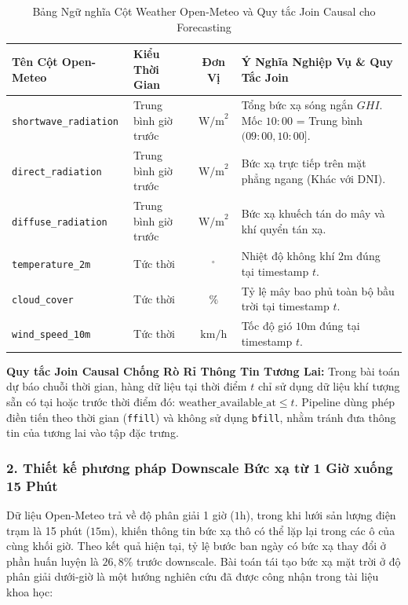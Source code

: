 \documentclass[12pt,a4paper]{article}
\begin{document}
\begin{table}[htbp]
\centering
\caption{Bảng Ngữ nghĩa Cột Weather Open-Meteo và Quy tắc Join Causal cho Forecasting}
\label{tab:openmeteo_semantics}
\begin{tabularx}{\linewidth}{l l c X}
\toprule
\textbf{Tên Cột Open-Meteo} & \textbf{Kiểu Thời Gian} & \textbf{Đơn Vị} & \textbf{Ý Nghĩa Nghiệp Vụ \& Quy Tắc Join} \\
\midrule
\texttt{shortwave\_radiation} & Trung bình giờ trước & $\text{W/m}^2$ & Tổng bức xạ sóng ngắn $GHI$. Mốc $10:00$ = Trung bình $(09:00, 10:00]$. \\
\texttt{direct\_radiation} & Trung bình giờ trước & $\text{W/m}^2$ & Bức xạ trực tiếp trên mặt phẳng ngang (Khác với DNI). \\
\texttt{diffuse\_radiation} & Trung bình giờ trước & $\text{W/m}^2$ & Bức xạ khuếch tán do mây và khí quyển tán xạ. \\
\texttt{temperature\_2m} & Tức thời & $^\circ\text{}$ & Nhiệt độ không khí $2\text{m}$ đúng tại timestamp $t$. \\
\texttt{cloud\_cover} & Tức thời & $\%$ & Tỷ lệ mây bao phủ toàn bộ bầu trời tại timestamp $t$. \\
\texttt{wind\_speed\_10m} & Tức thời & $\text{km/h}$ & Tốc độ gió $10\text{m}$ đúng tại timestamp $t$. \\
\bottomrule
\end{tabularx}
\end{table}

\textbf{Quy tắc Join Causal Chống Rò Rỉ Thông Tin Tương Lai:}  
Trong bài toán dự báo chuỗi thời gian, hàng dữ liệu tại thời điểm $t$ chỉ sử dụng dữ liệu khí tượng sẵn có tại hoặc trước thời điểm đó: $\text{weather\_available\_at} \le t$. Pipeline dùng phép điền tiến theo thời gian (\texttt{ffill}) và không sử dụng \texttt{bfill}, nhằm tránh đưa thông tin của tương lai vào tập đặc trưng.

\subsubsection{2. Thiết kế phương pháp Downscale Bức xạ từ 1 Giờ xuống 15 Phút}
Dữ liệu Open-Meteo trả về độ phân giải 1 giờ ($1\text{h}$), trong khi lưới sản lượng điện trạm là 15 phút ($15\text{m}$), khiến thông tin bức xạ thô có thể lặp lại trong các ô của cùng khối giờ. Theo kết quả hiện tại, tỷ lệ bước ban ngày có bức xạ thay đổi ở phần huấn luyện là $26{,}8\%$ trước downscale. Bài toán tái tạo bức xạ mặt trời ở độ phân giải dưới-giờ là một hướng nghiên cứu đã được công nhận trong tài liệu khoa học:
\end{document}
